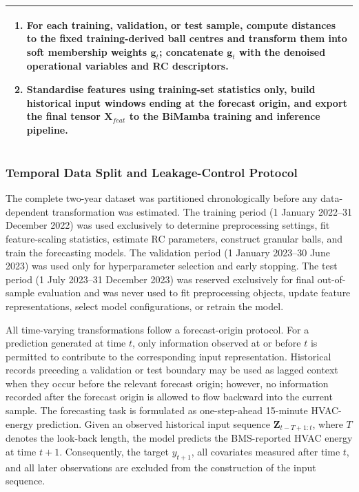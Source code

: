 \documentclass[11pt]{article}
\begin{document}
\begin{table}[H]
\begin{tabular}{@{}p{}@{}}
\begin{enumerate}[leftmargin=1.5em,itemsep=0.2em]
    \item For each training, validation, or test sample, compute distances to the fixed training-derived ball centres and transform them into soft membership weights $\mathbf{g}_t$; concatenate $\mathbf{g}_t$ with the denoised operational variables and RC descriptors.
    \item Standardise features using training-set statistics only, build historical input windows ending at the forecast origin, and export the final tensor $\mathbf{X}_{feat}$ to the BiMamba training and inference pipeline.
\end{enumerate}\\[-0.4em]
\bottomrule
\end{tabular}
\end{table}

\subsubsection{Temporal Data Split and Leakage-Control Protocol}
\label{sec:leakage_control}

The complete two-year dataset was partitioned chronologically before any data-dependent transformation was estimated. The training period (1 January 2022--31 December 2022) was used exclusively to determine preprocessing settings, fit feature-scaling statistics, estimate RC parameters, construct granular balls, and train the forecasting models. The validation period (1 January 2023--30 June 2023) was used only for hyperparameter selection and early stopping. The test period (1 July 2023--31 December 2023) was reserved exclusively for final out-of-sample evaluation and was never used to fit preprocessing objects, update feature representations, select model configurations, or retrain the model.

All time-varying transformations follow a forecast-origin protocol. For a prediction generated at time $t$, only information observed at or before $t$ is permitted to contribute to the corresponding input representation. Historical records preceding a validation or test boundary may be used as lagged context when they occur before the relevant forecast origin; however, no information recorded after the forecast origin is allowed to flow backward into the current sample. The forecasting task is formulated as one-step-ahead 15-minute HVAC-energy prediction. Given an observed historical input sequence $\mathbf{Z}_{t-T+1:t}$, where $T$ denotes the look-back length, the model predicts the BMS-reported HVAC energy at time $t+1$. Consequently, the target $y_{t+1}$, all covariates measured after time $t$, and all later observations are excluded from the construction of the input sequence.
\end{document}

